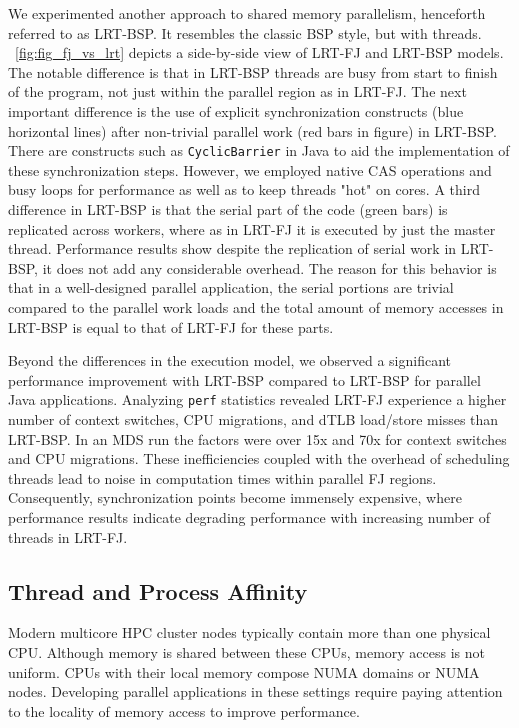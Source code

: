 \documentclass[10pt, conference, compsocconf]{IEEEtran}
\begin{document}
We experimented another approach to shared memory parallelism, henceforth referred to as \ac{LRT-BSP}. It resembles the classic \ac{BSP} style, but with threads. \figurename~\ref{fig:fig_fj_vs_lrt} depicts a side-by-side view of \ac{LRT-FJ} and \ac{LRT-BSP} models. The notable difference is that in \ac{LRT-BSP} threads are busy from start to finish of the program, not just within the parallel region as in \ac{LRT-FJ}. The next important difference is the use of explicit synchronization constructs (blue horizontal lines) after non-trivial parallel work (red bars in figure) in \ac{LRT-BSP}. There are constructs such as \texttt{CyclicBarrier} in Java to aid the implementation of these synchronization steps. However, we employed native \ac{CAS} operations and busy loops for performance as well as to keep threads "hot" on cores.  A third difference in \ac{LRT-BSP} is that the serial part of the code (green bars) is replicated across workers, where as in \ac{LRT-FJ} it is executed by just the master thread. Performance results show despite the replication of serial work in \ac{LRT-BSP}, it does not add any considerable overhead. The reason for this behavior is that in a well-designed parallel application, the serial portions are trivial compared to the parallel work loads and the total amount of memory accesses in \ac{LRT-BSP} is equal to that of \ac{LRT-FJ} for these parts. 

Beyond the differences in the execution model, we observed a significant performance improvement with \ac{LRT-BSP} compared to \ac{LRT-BSP} for parallel Java applications. Analyzing \texttt{perf} statistics revealed \ac{LRT-FJ} experience a higher number of context switches, \acs{CPU} migrations, and \ac{dTLB} load/store misses than \ac{LRT-BSP}. In an \ac{MDS} run the factors were over 15x and 70x for context switches and \acs{CPU} migrations. These inefficiencies coupled with the overhead of scheduling threads lead to noise in computation times within parallel \ac{FJ} regions. Consequently, synchronization points become immensely expensive, where performance results indicate degrading performance with increasing number of threads in \ac{LRT-FJ}.


\subsection{Thread and Process Affinity}
Modern multicore \ac{HPC} cluster nodes typically contain more than one physical \acs{CPU}. Although memory is shared between these \acp{CPU}, memory access is not uniform. \acp{CPU} with their local memory compose \ac{NUMA} domains or \ac{NUMA} nodes. Developing parallel applications in these settings require paying attention to the locality of memory access to improve performance.
\end{document}
